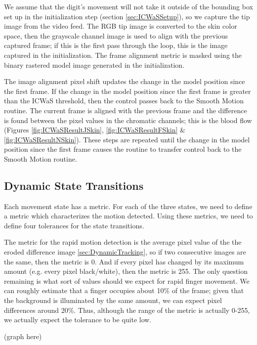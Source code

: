 We assume that the digit's movement will not take it outside of the bounding box set up in the initialization step (section \ref{sec:ICWaSSetup}), so we capture the tip image from the video feed. The RGB tip image is converted to the skin color space, then the grayscale channel image is used to align with the previous captured frame; if this is the first pass through the loop, this is the image captured in the initialization. The frame alignment metric is masked using the binary rastered model image generated in the initialization.

The image alignment pixel shift updates the change in the model position since the first frame. If the change in the model position since the first frame is greater than the ICWaS threshold, then the control passes back to the Smooth Motion routine. The current frame is aligned with the previous frame and the difference is found between the pixel values in the chromatic channels; this is the blood flow (Figures  \ref{fig:ICWaSResultJSkin}, \ref{fig:ICWaSResultFSkin} \& \ref{fig:ICWaSResultNSkin}). These steps are repeated until the change in the model position since the first frame causes the routine to transfer control back to the Smooth Motion routine.

\clearpage

\subsection{Dynamic State Transitions}\label{sec:DynamicStateTransitions}
Each movement state has a metric. For each of the three states, we need to define a metric which characterizes the motion detected. Using these metrics, we need to define four tolerances for the state transitions.

The metric for the rapid motion detection is the average pixel value of the the eroded difference image \ref{sec:DynamicTracking}, so if two consecutive images are the same, then the metric is 0. And if every pixel has changed by its maximum amount (e.g. every pixel black/white), then the metric is 255. The only question remaining is what sort of values should we expect for rapid finger movement. We can roughly estimate that a finger occupies about 10\% of the frame; given that the background is illuminated by the same amount, we can expect pixel differences around 20\%. Thus, although the range of the metric is actually 0-255, we actually expect the tolerance to be quite low.

(graph here)

